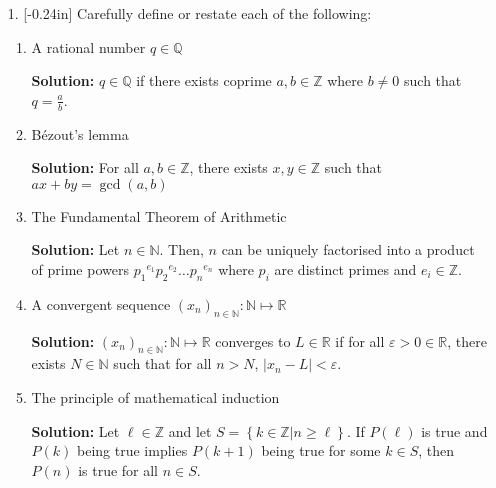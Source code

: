 \documentclass[letterpaper,12pt]{article}
\newcommand{\set}[1]{\left\{ #1 \right\}}
\theoremstyle{definition}
\begin{document}
\begin{enumerate}
    \item[1.] \reversemarginpar{}[-0.24in] Carefully define or restate each of the following: \begin{enumerate}
        \item A rational number $q \in \mathbb{Q}$
        \begin{mdframed}
            \textbf{Solution:}
            $q \in \mathbb{Q}$ if there exists coprime $a,b \in \mathbb{Z}$ where $b \neq 0$ such that $q = \frac{a}{b}$.
        \end{mdframed}
        \vspace{0.5in}
        \item Bézout's lemma
                 \begin{mdframed}
            \textbf{Solution:}
            For all $a,b \in \mathbb{Z}$, there exists $x,y \in \mathbb{Z}$ such that $ax + by = \gcd (a,b)$
        \end{mdframed}
                \vspace{0.5in}
        \item The Fundamental Theorem of Arithmetic
                 \begin{mdframed}
            \textbf{Solution:}
            Let $n \in \mathbb{N}$. Then, $n$ can be uniquely factorised into a product of prime powers ${p_1}^{e_1}{p_2}^{e_2}\ldots {p_n}^{e_n}$ where $p_i$ are distinct primes and $e_i \in \mathbb{Z}$.
        \end{mdframed}
                \vspace{0.3in}
        \item A convergent sequence $(x_n)_{n \in \mathbb{N}} : \mathbb{N} \mapsto \mathbb{R}$
                 \begin{mdframed}
            \textbf{Solution:}
             $(x_n)_{n \in \mathbb{N}} : \mathbb{N} \mapsto \mathbb{R}$ converges to $L \in \mathbb{R}$ if for all $\varepsilon > 0 \in \mathbb{R}$, there exists $N \in \mathbb{N}$ such that for all $n > N$, $|x_n - L | < \varepsilon$.
        \end{mdframed}
                \vspace{0.3in}
        \item The principle of mathematical induction
         \begin{mdframed}
            \textbf{Solution:}
            Let $\ell \in \mathbb{Z}$ and let $S = \set{k \in \mathbb{Z} | n \geq \ell}$. If $P(\ell)$ is true and $P(k)$ being true implies $P(k+1)$ being true for some $k \in S$, then $P(n)$ is true for all $n \in S$.
        \end{mdframed}
    \end{enumerate}
\end{enumerate}
\end{document}
